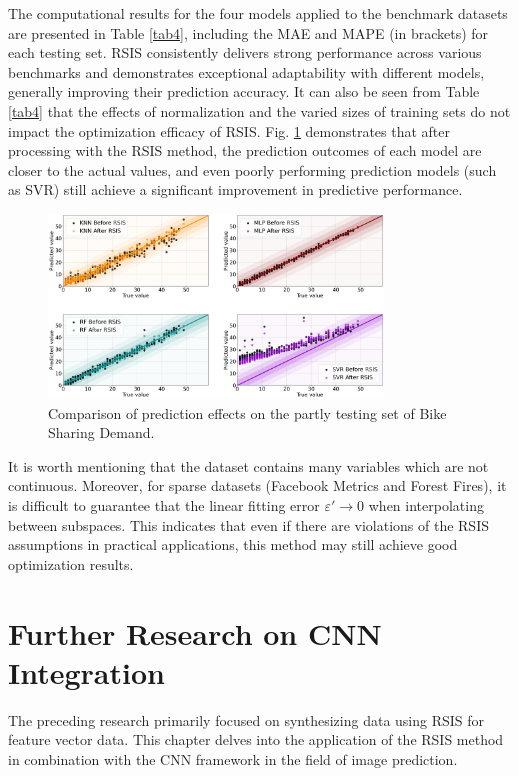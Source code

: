 \documentclass[lettersize,journal]{IEEEtran}
\begin{document}
The computational results for the four models applied to the 
benchmark datasets are presented in Table \ref{tab4}, including the MAE 
and MAPE (in brackets) for each testing set. RSIS consistently 
delivers strong performance across various benchmarks and 
demonstrates exceptional adaptability with different models, 
generally improving their prediction accuracy. It can also be 
seen from Table \ref{tab4} that the effects of normalization 
and the varied sizes of training sets do not impact the 
optimization efficacy of RSIS. Fig. \ref{Fig6} demonstrates 
that after processing with the RSIS method, the prediction outcomes 
of each model are closer to the actual values, and even poorly 
performing prediction models (such as SVR) still achieve a 
significant improvement in predictive performance. 


\begin{figure}[!t]
  \centering
  \includegraphics[width=3.5in]{Fig6.png}
  \caption{Comparison of prediction effects on the partly testing 
  set of Bike Sharing Demand.}
  \label{Fig6}
\end{figure}

It is worth mentioning that the dataset contains many variables 
which are not continuous. Moreover, for sparse datasets 
(Facebook Metrics and Forest Fires), it is difficult to guarantee 
that the linear fitting error $\varepsilon'\rightarrow0$ when 
interpolating between subspaces. This indicates that even if there 
are violations of the RSIS assumptions in practical applications, 
this method may still achieve good optimization results. 

\section{Further Research on CNN Integration}
The preceding research primarily focused on synthesizing data 
using RSIS for feature vector data. This chapter delves into the 
application of the RSIS method in combination with the CNN 
framework in the field of image prediction.
\end{document}
